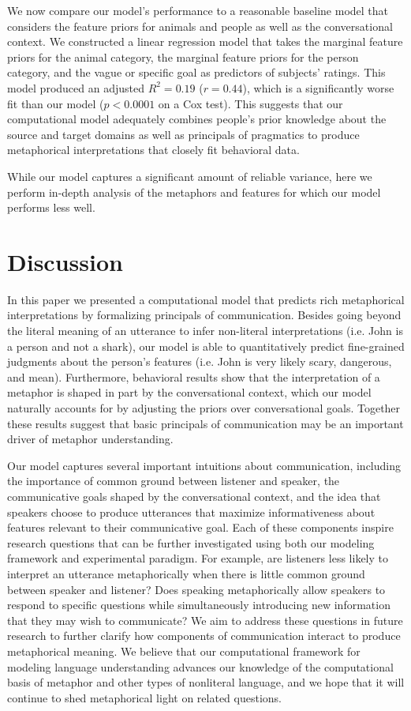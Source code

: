 \documentclass[10pt,letterpaper]{article}
\begin{document}
We now compare our model's performance to a reasonable baseline model that considers the feature priors for animals and people as well as the conversational context. We constructed a linear regression model that takes the marginal feature priors for the animal category, the marginal feature priors for the person category, and the vague or specific goal as predictors of subjects' ratings. This model produced an adjusted $R^2 = 0.19$ ($r = 0.44$), which is a significantly worse fit than our model ($p < 0.0001$ on a Cox test). This suggests that our computational model adequately combines people's prior knowledge about the source and target domains as well as principals of pragmatics to produce metaphorical interpretations that closely fit behavioral data.

While our model captures a significant amount of reliable variance, here we perform in-depth analysis of the metaphors and features for which our model performs less well.

\section{Discussion}
In this paper we presented a computational model that predicts rich metaphorical interpretations by formalizing principals of communication. Besides going beyond the literal meaning of an utterance to infer non-literal interpretations (i.e. John is a person and not a shark), our model is able to quantitatively predict fine-grained judgments about the person's features (i.e. John is very likely scary, dangerous, and mean). Furthermore, behavioral results show that the interpretation of a metaphor is shaped in part by the conversational context, which our model naturally accounts for by adjusting the priors over conversational goals. Together these results suggest that basic principals of communication may be an important driver of metaphor understanding.

Our model captures several important intuitions about communication, including the importance of common ground between listener and speaker, the communicative goals shaped by the conversational context, and the idea that speakers choose to produce utterances that maximize informativeness about features relevant to their communicative goal. Each of these components inspire research questions that can be further investigated using both our modeling framework and experimental paradigm. For example, are listeners less likely to interpret an utterance metaphorically when there is little common ground between speaker and listener? Does speaking metaphorically allow speakers to respond to specific questions while simultaneously introducing new information that they may wish to communicate? We aim to address these questions in future research to further clarify how components of communication interact to produce metaphorical meaning. We believe that our computational framework for modeling language understanding advances our knowledge of the computational basis of metaphor and other types of nonliteral language, and we hope that it will continue to shed metaphorical light on related questions.
\end{document}
